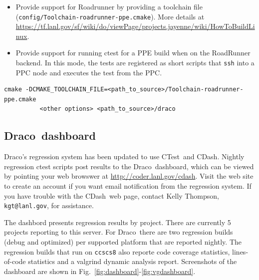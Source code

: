 \documentclass[note]{ResearchNote_pdf}
\newcommand{\draco}{Draco}
\newcommand{\ctest}{\textsf{CTest}}
\newcommand{\cdash}{\textsf{CDash}}
\begin{document}
\begin{itemize}
\item Provide support for \textsf{Roadrunner} by providing a toolchain file
  (\texttt{config/\-Toolchain-roadrunner-ppe.cmake}).  More details at
  \href{https://tf.lanl.gov/sf/wiki/do/viewPage/projects.jayenne/wiki/HowToBuildLinux}{https://tf.lanl.gov/sf/wiki/do/viewPage/projects.jayenne/wiki/\-HowToBuildLinux}.
\item Provide support for running ctest for a PPE build when on the
  RoadRunner backend.  In this mode, the tests are registered as short
  scripts that \texttt{ssh} into a PPC node and executes the test from
  the PPC. 
\end{itemize}
\begin{lstlisting}[xleftmargin=0.50in, xrightmargin=0.50in]
cmake -DCMAKE_TOOLCHAIN_FILE=<path_to_source>/Toolchain-roadrunner-ppe.cmake
          <other options> <path_to_source>/draco
\end{lstlisting}



\subsection{\draco\ dashboard}
\label{sec:dracodash}
\draco's regression system has been updated to use \ctest\ and \cdash.
Nightly regression ctest scripts post results to the
\draco\ dashboard, which can be viewed by pointing your web browswer
at
\href{http://coder.lanl.gov/cdash}{http://coder.\-lanl.\-gov/\-cdash}.
Visit the web site to create an account if you want email notification
from the regression system.  If you have trouble with the \cdash\ web
page, contact Kelly Thompson, \texttt{kgt@lanl.gov}, for assistance.

The dashbord presents regression results by project.  There are
currently 5 projects reporting to this server.  For \draco\ there are
two regression builds (debug and optimized) per supported platform
that are reported nightly.  The regression builds that run on
\texttt{ccscs8} also reporte code coverage statistics, lines-of-code
statistics and a valgrind dynamic analysis report.  Screenshots of
the dashboard are shown in
Fig.~\ref{fig:dashboard}-\ref{fig:vgdashboard}. 
\end{document}
